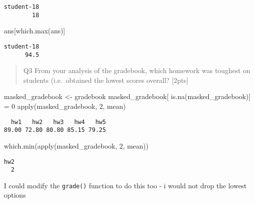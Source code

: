 \documentclass[
  letterpaper,
  DIV=11,
  numbers=noendperiod]{scrartcl}
\newenvironment{Shaded}{\begin{snugshade}}{\end{snugshade}}
\newcommand{\DecValTok}[1]{\textcolor[rgb]{0.68,0.00,0.00}{#1}}
\newcommand{\FunctionTok}[1]{\textcolor[rgb]{0.28,0.35,0.67}{#1}}
\newcommand{\NormalTok}[1]{\textcolor[rgb]{0.00,0.23,0.31}{#1}}
\newcommand{\OtherTok}[1]{\textcolor[rgb]{0.00,0.23,0.31}{#1}}
\begin{document}
\begin{verbatim}
student-18 
        18 
\end{verbatim}

\begin{Shaded}
\begin{Highlighting}[]
\NormalTok{ans[}\FunctionTok{which.max}\NormalTok{(ans)]}
\end{Highlighting}
\end{Shaded}

\begin{verbatim}
student-18 
      94.5 
\end{verbatim}

\begin{quote}
Q3 From your analysis of the gradebook, which homework was toughest on
students (i.e.~obtained the lowest scores overall? {[}2pts{]}
\end{quote}

\begin{Shaded}
\begin{Highlighting}[]
\NormalTok{masked\_gradebook }\OtherTok{\textless{}{-}}\NormalTok{ gradebook}
\NormalTok{masked\_gradebook[ }\FunctionTok{is.na}\NormalTok{(masked\_gradebook)] }\OtherTok{=} \DecValTok{0}
\FunctionTok{apply}\NormalTok{(masked\_gradebook, }\DecValTok{2}\NormalTok{, mean)}
\end{Highlighting}
\end{Shaded}

\begin{verbatim}
  hw1   hw2   hw3   hw4   hw5 
89.00 72.80 80.80 85.15 79.25 
\end{verbatim}

\begin{Shaded}
\begin{Highlighting}[]
\FunctionTok{which.min}\NormalTok{(}\FunctionTok{apply}\NormalTok{(masked\_gradebook, }\DecValTok{2}\NormalTok{, mean))}
\end{Highlighting}
\end{Shaded}

\begin{verbatim}
hw2 
  2 
\end{verbatim}

I could modify the \texttt{grade()} function to do this too - i would
not drop the lowest options
\end{document}
